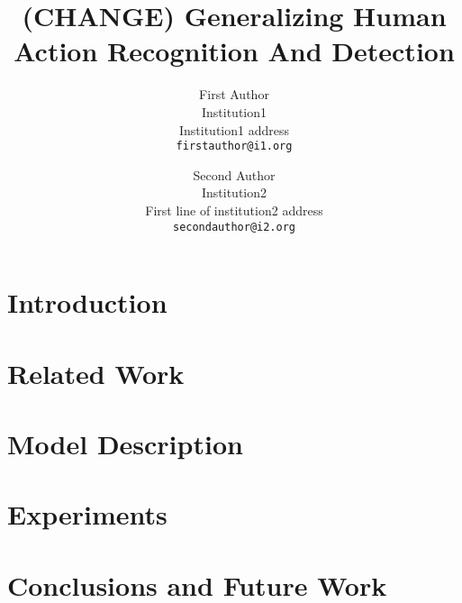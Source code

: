 \documentclass[10pt,twocolumn,letterpaper]{article}
\newcommand{\+}[1]{\ensuremath{{\boldsymbol #1}}}
\begin{document}
\title{(CHANGE) Generalizing Human Action  Recognition And Detection}

\author{First Author\\
Institution1\\
Institution1 address\\
{\tt\small firstauthor@i1.org}
\and
Second Author\\
Institution2\\
First line of institution2 address\\
{\tt\small secondauthor@i2.org}
}

\maketitle




\begin{abstract}

\end{abstract}

\section{Introduction} \label{sec:introduction}  
%
%
%
\section{Related Work} \label{sec:related_work}  
%
%
\section{Model Description} \label{sec:model} 
%
%
\section{Experiments} \label{sec:experiments} 
%
%
\section{Conclusions and Future Work} \label{sec:conclusions} 

{\small


}
\end{document}
